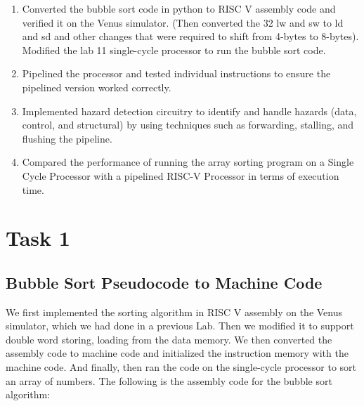\documentclass[12pt]{article}
\begin{document}
\begin{enumerate}
    \item Converted the bubble sort code in python to RISC V assembly code and verified it on the Venus simulator. (Then converted the 32 lw and sw to ld and sd and other changes that were required to shift from 4-bytes to 8-bytes). Modified the lab 11 single-cycle processor to run the bubble sort code.
    \item Pipelined the processor and tested individual instructions to ensure the pipelined version worked correctly.
    \item Implemented hazard detection circuitry to identify and handle hazards (data, control, and structural) by using techniques such as forwarding, stalling, and flushing the pipeline.
    \item Compared the performance of running the array sorting program on a Single Cycle Processor with a pipelined RISC-V Processor in terms of execution time.
    
\end{enumerate}

\section{Task 1}\label{task1}
    \subsection{Bubble Sort Pseudocode to Machine Code}\label{task1-0}
        We first implemented the sorting algorithm in RISC V assembly on the Venus simulator, which we had done in a previous Lab. Then we modified it to support double word storing, loading from the data memory. We then converted the assembly code to machine code and initialized the instruction memory with the machine code. And finally, then ran the code on the single-cycle processor to sort an array of numbers. The following is the assembly code for the bubble sort algorithm:
        
\end{document}
